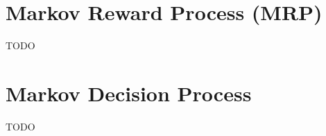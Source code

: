 \section{Markov Reward Process (MRP)}\label{sec:markov-reward-process}
TODO
%
%
%


\section{Markov Decision Process}\label{sec:markov-decision-process}
TODO



%
%

